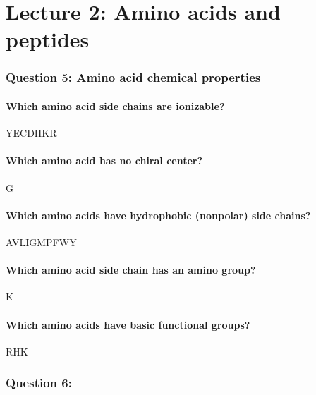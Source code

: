 \documentclass[letterpaper, 12pt]{article}
\begin{document}
\section*{Lecture 2: Amino acids and peptides}

\subsubsection*{Question 5: Amino acid chemical properties}

\paragraph{Which amino acid side chains are ionizable?} YECDHKR

\paragraph{Which amino acid has no chiral center?} G

\paragraph{Which amino acids have hydrophobic (nonpolar) side chains?} AVLIGMPFWY

\paragraph{Which amino acid side chain has an amino group?} K

\paragraph{Which amino acids have basic functional groups?} RHK

\subsubsection*{Question 6:}
\end{document}
